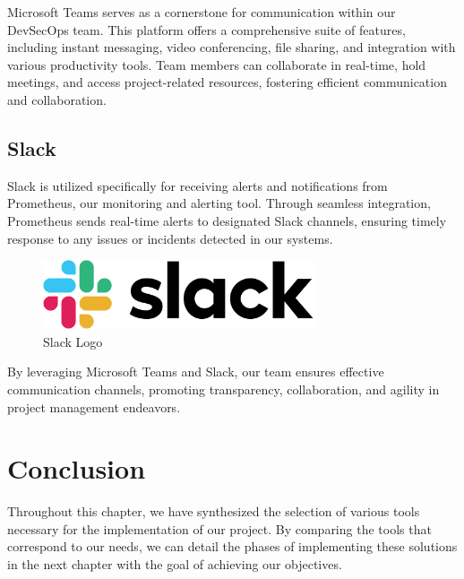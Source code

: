Microsoft Teams serves as a cornerstone for communication within our DevSecOps team. This platform offers a comprehensive suite of features, including instant messaging, video conferencing, file sharing, and integration with various productivity tools. Team members can collaborate in real-time, hold meetings, and access project-related resources, fostering efficient communication and collaboration.

\subsection{Slack}

Slack is utilized specifically for receiving alerts and notifications from Prometheus, our monitoring and alerting tool. Through seamless integration, Prometheus sends real-time alerts to designated Slack channels, ensuring timely response to any issues or incidents detected in our systems.
\begin{figure}[H]
\centering
\includegraphics[width=8cm]{Logos/slack_logo.png}
\caption{Slack Logo}
\end{figure}

By leveraging Microsoft Teams and Slack, our team ensures effective communication channels, promoting transparency, collaboration, and agility in project management endeavors.

\section{Conclusion}

Throughout this chapter, we have synthesized the selection of various tools necessary for the implementation of our project. By comparing the tools that correspond to our needs, we can detail the phases of implementing these solutions in the next chapter with the goal of achieving our objectives.

\pagebreak